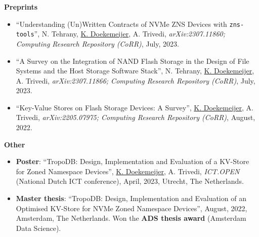 \documentclass[letterpaper,11pt]{article}
\begin{document}
\textbf{Preprints}
\begin{itemize}[label={}]
\item
  ``Understanding (Un)Written Contracts of NVMe ZNS Devices with \texttt{zns-tools}'', 
  N. Tehrany, \underline{K. Doekemeijer}, A. Trivedi,
  \textit{arXiv:2307.11860; Computing Research Repository (CoRR)}, 
  July, 2023.

\item
  ``A Survey on the Integration of NAND Flash Storage in the Design of File Systems and the Host Storage Software Stack'', 
  N. Tehrany, \underline{K. Doekemeijer}, A. Trivedi,
  \textit{arXiv:2307.11866; Computing Research Repository (CoRR)}, 
  July, 2023.

\item
  ``Key-Value Stores on Flash Storage Devices: A Survey'', 
  \underline{K. Doekemeijer}, A. Trivedi,
  \textit{arXiv:2205.07975; Computing Research Repository (CoRR)}, 
  August, 2022.
\end{itemize}


\textbf{Other}
\begin{itemize}[label={}]
\item
  \textbf{Poster}: 
  ``TropoDB: Design, Implementation and Evaluation of a KV-Store for Zoned Namespace Devices'',
  \underline{K. Doekemeijer}, A. Trivedi,
  \textit{ICT.OPEN} (National Dutch ICT conference),
  April, 2023, Utrecht, The Netherlands.

\item
  \textbf{Master thesis}: 
  ``TropoDB: Design, Implementation and Evaluation of an Optimised KV-Store for NVMe Zoned Namespace Devices'',
  August, 2022, Amsterdam, The Netherlands.
  Won the \textbf{ADS thesis award} (Amsterdam Data Science).
\end{itemize}

\end{document}
